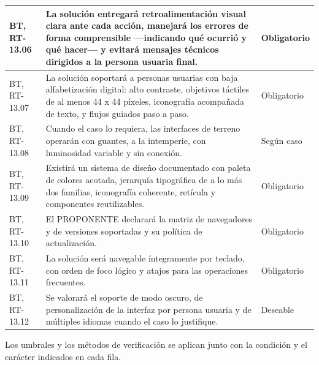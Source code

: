 \begin{longtable}{|L{0.098425\AnchoTablaAnexo}|L{0.814961\AnchoTablaAnexo}|L{0.086614\AnchoTablaAnexo}|}
BT, RT-13.06 &
La solución entregará retroalimentación visual clara ante cada acción, manejará los errores de forma comprensible —indicando qué ocurrió y qué hacer— y evitará mensajes técnicos dirigidos a la persona usuaria final. &
Obligatorio \\ \hline
{}
BT, RT-13.07 &
La solución soportará a personas usuarias con baja alfabetización digital: alto contraste, objetivos táctiles de al menos 44 x 44 píxeles, iconografía acompañada de texto, y flujos guiados paso a paso. &
Obligatorio \\ \hline
BT, RT-13.08 &
Cuando el caso lo requiera, las interfaces de terreno operarán con guantes, a la intemperie, con luminosidad variable y sin conexión. &
Según caso \\ \hline
{}
BT, RT-13.09 &
Existirá un sistema de diseño documentado con paleta de colores acotada, jerarquía tipográfica de a lo más dos familias, iconografía coherente, retícula y componentes reutilizables. &
Obligatorio \\ \hline
BT, RT-13.10 &
El PROPONENTE declarará la matriz de navegadores y de versiones soportadas y su política de actualización. &
Obligatorio \\ \hline
{}
BT, RT-13.11 &
La solución será navegable íntegramente por teclado, con orden de foco lógico y atajos para las operaciones frecuentes. &
Obligatorio \\ \hline
BT, RT-13.12 &
Se valorará el soporte de modo oscuro, de personalización de la interfaz por persona usuaria y de múltiples idiomas cuando el caso lo justifique. &
Deseable \\ \hline
\end{longtable}

Los umbrales y los métodos de verificación se aplican junto con la condición y el carácter indicados en cada fila.
